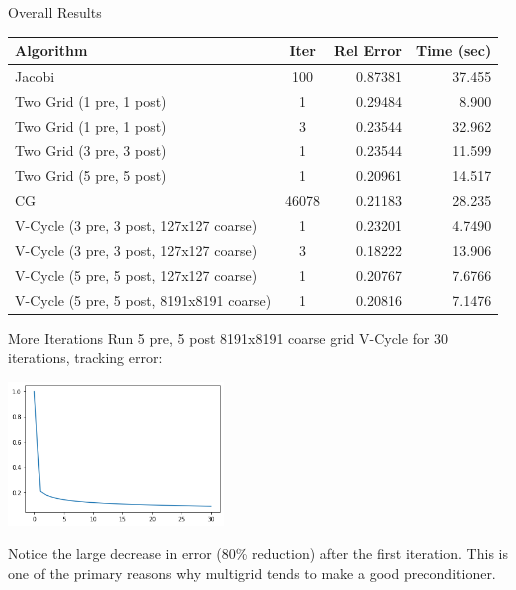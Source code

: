 \documentclass[11pt]{beamer}
\begin{document}
  \begin{frame}{Overall Results}
    \begin{table}
      \scriptsize
      \begin{tabular}{lcrr}
        Algorithm & Iter & Rel Error & Time (sec) \\
        \hline
        Jacobi                                    & 100   &  0.87381  & 37.455 \\
        Two Grid (1 pre, 1 post)                  & 1	    &  0.29484  &  8.900 \\
        Two Grid (1 pre, 1 post)                  & 3	    &  0.23544  & 32.962 \\
        Two Grid (3 pre, 3 post)                  & 1	    &  0.23544  & 11.599 \\
        Two Grid (5 pre, 5 post)                  & 1     &  0.20961  & 14.517 \\
        CG                                        & 46078 &  0.21183  & 28.235 \\
        V-Cycle (3 pre, 3 post, 127x127 coarse)   & 1     &  0.23201  & 4.7490 \\
        V-Cycle (3 pre, 3 post, 127x127 coarse)   & 3     &  0.18222  & 13.906 \\
        V-Cycle (5 pre, 5 post, 127x127 coarse)   & 1     &  0.20767  & 7.6766 \\
        V-Cycle (5 pre, 5 post, 8191x8191 coarse) & 1     &  0.20816  & 7.1476
      \end{tabular}
    \end{table}
  \end{frame}
  \begin{frame}{More Iterations}
    Run 5 pre, 5 post 8191x8191 coarse grid V-Cycle for 30 iterations, tracking
    error:
    \begin{center}
      \includegraphics[height=1.5in]{output_41_1.png}
    \end{center}
    Notice the large decrease in error (80\% reduction) after the first iteration.
    This is one of the primary reasons why multigrid tends to make a good preconditioner.

  \end{frame}
\end{document}
